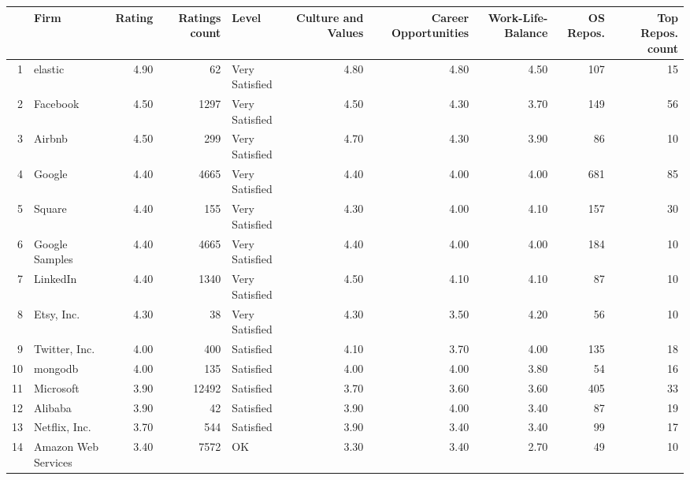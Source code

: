 

\begin{tabular}{rlrrlrrrrr}



  \hline
 & Firm & Rating & Ratings count & Level & Culture and Values & Career Opportunities & Work-Life-Balance & OS Repos. & Top Repos. count \\
  \hline
1 & elastic & 4.90 &  62 & Very Satisfied & 4.80 & 4.80 & 4.50 & 107 &  15 \\
  2 & Facebook & 4.50 & 1297 & Very Satisfied & 4.50 & 4.30 & 3.70 & 149 &  56 \\
  3 & Airbnb & 4.50 & 299 & Very Satisfied & 4.70 & 4.30 & 3.90 &  86 &  10 \\
  4 & Google & 4.40 & 4665 & Very Satisfied & 4.40 & 4.00 & 4.00 & 681 &  85 \\
  5 & Square & 4.40 & 155 & Very Satisfied & 4.30 & 4.00 & 4.10 & 157 &  30 \\
  6 & Google Samples & 4.40 & 4665 & Very Satisfied & 4.40 & 4.00 & 4.00 & 184 &  10 \\
  7 & LinkedIn & 4.40 & 1340 & Very Satisfied & 4.50 & 4.10 & 4.10 &  87 &  10 \\
  8 & Etsy, Inc. & 4.30 &  38 & Very Satisfied & 4.30 & 3.50 & 4.20 &  56 &  10 \\
  9 & Twitter, Inc. & 4.00 & 400 & Satisfied & 4.10 & 3.70 & 4.00 & 135 &  18 \\
  10 & mongodb & 4.00 & 135 & Satisfied & 4.00 & 4.00 & 3.80 &  54 &  16 \\
  11 & Microsoft & 3.90 & 12492 & Satisfied & 3.70 & 3.60 & 3.60 & 405 &  33 \\
  12 & Alibaba & 3.90 &  42 & Satisfied & 3.90 & 4.00 & 3.40 &  87 &  19 \\
  13 & Netflix, Inc. & 3.70 & 544 & Satisfied & 3.90 & 3.40 & 3.40 &  99 &  17 \\
  14 & Amazon Web Services & 3.40 & 7572 & OK & 3.30 & 3.40 & 2.70 &  49 &  10 \\
   \hline

\end{tabular}
